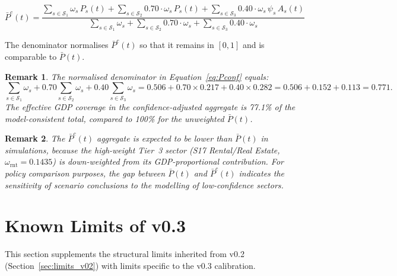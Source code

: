 \documentclass[11pt,a4paper]{article}
\newtheorem{remark}{Remark}
\begin{document}
\begin{equation}
\bar{P}^c(t)
= \frac{\displaystyle\sum_{s \in \mathcal{S}_1} \omega_s\, P_s(t)
+ \sum_{s \in \mathcal{S}_2} 0.70\cdot\omega_s\, P_s(t)
+ \sum_{s \in \mathcal{S}_3} 0.40\cdot\omega_s\, \psi_s\, A_s(t)}%
{\displaystyle\sum_{s \in \mathcal{S}_1} \omega_s
+ \sum_{s \in \mathcal{S}_2} 0.70\cdot\omega_s
+ \sum_{s \in \mathcal{S}_3} 0.40\cdot\omega_s}
\label{eq:Pconf}
\end{equation}

The denominator normalises $\bar{P}^c(t)$ so that it remains in $[0,1]$ and is comparable to $\bar{P}(t)$.

\begin{remark}
The normalised denominator in Equation~\eqref{eq:Pconf} equals:
\[
\sum_{s \in \mathcal{S}_1} \omega_s
+ 0.70\sum_{s \in \mathcal{S}_2} \omega_s
+ 0.40\sum_{s \in \mathcal{S}_3} \omega_s
= 0.506 + 0.70\times 0.217 + 0.40\times 0.282
= 0.506 + 0.152 + 0.113 = 0.771.
\]
The effective GDP coverage in the confidence-adjusted aggregate is 77.1\% of the model-consistent total, compared to 100\% for the unweighted $\bar{P}(t)$.
\end{remark}

\begin{remark}
The $\bar{P}^c(t)$ aggregate is expected to be lower than $\bar{P}(t)$ in simulations, because the high-weight Tier~3 sector (S17 Rental/Real Estate, $\omega_{\text{rnt}} = 0.1435$) is down-weighted from its GDP-proportional contribution. For policy comparison purposes, the gap between $\bar{P}(t)$ and $\bar{P}^c(t)$ indicates the sensitivity of scenario conclusions to the modelling of low-confidence sectors.
\end{remark}

\section{Known Limits of v0.3}
\label{sec:limits_v03}

This section supplements the structural limits inherited from v0.2 (Section~\ref{sec:limits_v02}) with limits specific to the v0.3 calibration.
\end{document}
